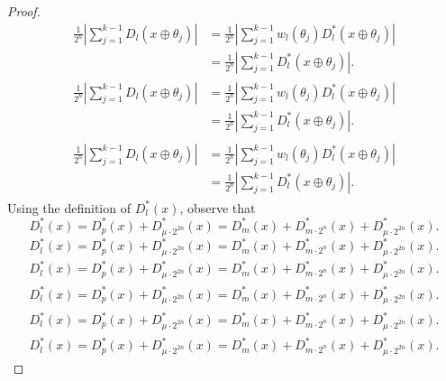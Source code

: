 \documentclass{amsart}
\numberwithin{equation}{section}
\begin{document}
\begin{proof}
{\begin{multline}
\frac{1}{2^{n}}\left|\sum_{j=1}^{k-1}D_l(x\oplus\theta_j)\right|
&=\frac{1}{2^{n}}\left|\sum_{j=1}^{k-1}w_l\left(\theta_j\right)D_l^*(x\oplus\theta_j)\right|\\
&=\frac{1}{2^{n}}\left|\sum_{j=1}^{k-1}D_l^*(x\oplus\theta_j)\right|.
\end{multline}\fi  
{}\begin{multline*}\begin{split}\label{a12}
\frac{1}{2^{n}}\left|\sum_{j=1}^{k-1}D_l(x\oplus\theta_j)\right|
&=\frac{1}{2^{n}}\left|\sum_{j=1}^{k-1}w_l\left(\theta_j\right)D_l^*(x\oplus\theta_j)\right|\\
&=\frac{1}{2^{n}}\left|\sum_{j=1}^{k-1}D_l^*(x\oplus\theta_j)\right|.
\end{split}\end{multline*}\fi
{}\begin{multline}\begin{split}\label{a12}
\frac{1}{2^{n}}\left|\sum_{j=1}^{k-1}D_l(x\oplus\theta_j)\right|
&=\frac{1}{2^{n}}\left|\sum_{j=1}^{k-1}w_l\left(\theta_j\right)D_l^*(x\oplus\theta_j)\right|\\
&=\frac{1}{2^{n}}\left|\sum_{j=1}^{k-1}D_l^*(x\oplus\theta_j)\right|.
\end{split}\end{multline}\fi
}
Using the definition of $D_l^*(x)$, observe that
{
\begin{equation*} 
D_l^*(x)=D_p^*(x)+D_{\mu\cdot 2^{2n}}^*(x)=D_{m}^*(x)+D_{m\cdot 2^n}^*(x)+D_{\mu\cdot 2^{2n}}^*(x).
 \end{equation*}\fi  
{}\begin{equation}
D_l^*(x)=D_p^*(x)+D_{\mu\cdot 2^{2n}}^*(x)=D_{m}^*(x)+D_{m\cdot 2^n}^*(x)+D_{\mu\cdot 2^{2n}}^*(x).
\end{equation}\fi   
{}\begin{align*}
D_l^*(x)=D_p^*(x)+D_{\mu\cdot 2^{2n}}^*(x)=D_{m}^*(x)+D_{m\cdot 2^n}^*(x)+D_{\mu\cdot 2^{2n}}^*(x).
\end{align*}\fi   
{}\begin{align}
D_l^*(x)=D_p^*(x)+D_{\mu\cdot 2^{2n}}^*(x)=D_{m}^*(x)+D_{m\cdot 2^n}^*(x)+D_{\mu\cdot 2^{2n}}^*(x).
\end{align}\fi    
{}\begin{gather*}
D_l^*(x)=D_p^*(x)+D_{\mu\cdot 2^{2n}}^*(x)=D_{m}^*(x)+D_{m\cdot 2^n}^*(x)+D_{\mu\cdot 2^{2n}}^*(x).
\end{gather*}\fi  
{}\begin{gather}
D_l^*(x)=D_p^*(x)+D_{\mu\cdot 2^{2n}}^*(x)=D_{m}^*(x)+D_{m\cdot 2^n}^*(x)+D_{\mu\cdot 2^{2n}}^*(x).

\end{gather}}
\end{proof}
\end{document}
